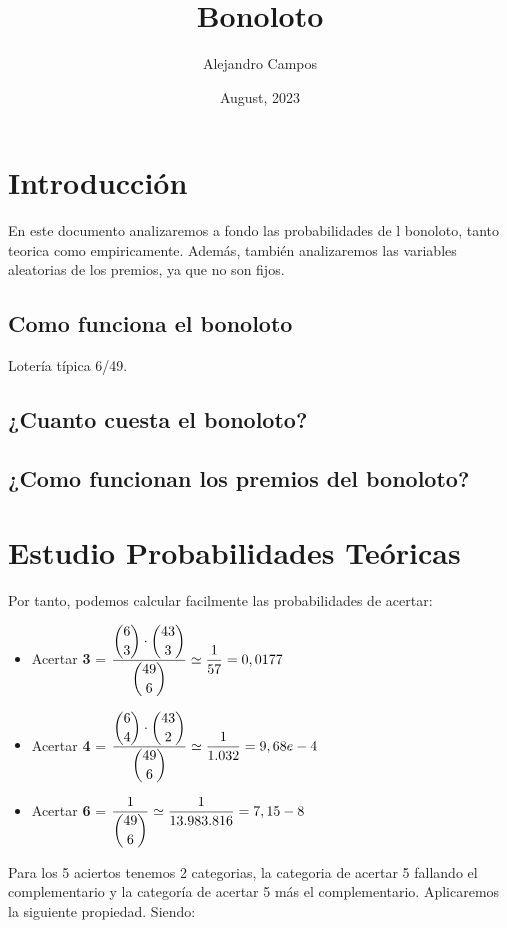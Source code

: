 \documentclass{article}
\title{\textbf{Bonoloto}}
\author{Alejandro Campos}
\date{August, 2023}
\begin{document}
\maketitle
\newpage
\tableofcontents

\newpage

\section{Introducción}
En este documento analizaremos a fondo las probabilidades de l bonoloto, tanto teorica como empiricamente. Además, también analizaremos las variables aleatorias de los premios, ya que no son fijos.

\subsection{Como funciona el bonoloto}
Lotería típica 6/49.

\subsection{¿Cuanto cuesta el bonoloto?}

\subsection{¿Como funcionan los premios del bonoloto?}

\section{Estudio Probabilidades Teóricas}

Por tanto, podemos calcular facilmente las probabilidades de acertar:

\begin{itemize}
    \item Acertar \textbf{3} = $\dfrac{\dbinom{6}{3} \cdot \dbinom{43}{3}}{\dbinom{49}{6}} \simeq \dfrac{1}{57} = 0,0177$ 
    \item Acertar \textbf{4} = $\dfrac{\dbinom{6}{4} \cdot \dbinom{43}{2}}{\dbinom{49}{6}} \simeq \dfrac{1}{1.032} = 9,68e-4$ 
    \item Acertar \textbf{6} = $\dfrac{1}{\dbinom{49}{6}} \simeq \dfrac{1}{13.983.816} = 7,15-8$
\end{itemize}

Para los 5 aciertos tenemos 2 categorias, la categoria de acertar 5 fallando el complementario y la categoría de acertar 5 más el complementario. Aplicaremos la siguiente propiedad. Siendo:
\end{document}
